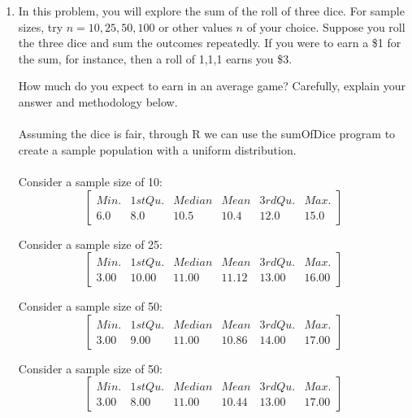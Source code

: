 \documentclass{report}
\begin{document}
\begin{enumerate}

\item In this problem, you will explore the sum of the roll of three dice.
For sample sizes, try $n = 10, 25, 50, 100$ or other values $n$ of your choice.
Suppose you roll the three dice and sum the outcomes repeatedly.  If you
were to earn a \$1 for the sum, for instance, then a roll of 1,1,1 earns you
\$3. 

How much do you expect to earn in an average game?
Carefully, explain your answer and methodology below.\\\\

Assuming the dice is fair, through R we can use the sumOfDice program to create a sample population with a uniform distribution.\\\\
Consider a sample size of 10:\\
\begin{equation}
\begin{bmatrix}
   Min.&1st Qu.&Median&Mean&3rd Qu.&Max.\\
        6.0&8.0&10.5&10.4&12.0&15.0 
\end{bmatrix}
\end{equation}

Consider a sample size of 25:\\
\begin{equation}
\begin{bmatrix}
   Min.&1st Qu.&Median&Mean&3rd Qu.&Max.\\
   3.00&10.00&11.00&11.12&13.00&16.00 
\end{bmatrix}
\end{equation}

Consider a sample size of 50:\\
\begin{equation}
\begin{bmatrix}
   Min.&1st Qu.&Median&Mean&3rd Qu.&Max.\\
   3.00&9.00&11.00&10.86&14.00&17.00 
\end{bmatrix}
\end{equation}

Consider a sample size of 50:\\
\begin{equation}
\begin{bmatrix}
   Min.&1st Qu.&Median&Mean&3rd Qu.&Max.\\
   3.00 &8.00&11.00&10.44&13.00&17.00 
\end{bmatrix}
\end{equation}


\end{enumerate}
\end{document}
